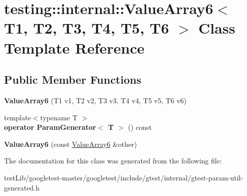 \hypertarget{classtesting_1_1internal_1_1ValueArray6}{}\section{testing\+:\+:internal\+:\+:Value\+Array6$<$ T1, T2, T3, T4, T5, T6 $>$ Class Template Reference}
\label{classtesting_1_1internal_1_1ValueArray6}
\subsection*{Public Member Functions}
\begin{DoxyCompactItemize}
\item 
\mbox{\label{classtesting_1_1internal_1_1ValueArray6_ad1c323929591d89807220281ceb6d4d5}} 
{\bfseries Value\+Array6} (T1 v1, T2 v2, T3 v3, T4 v4, T5 v5, T6 v6)
\item 
\mbox{\label{classtesting_1_1internal_1_1ValueArray6_ab6cb557146bca7cf5fcfa40f10dee9da}} 
{\footnotesize template$<$typename T $>$ }\\{\bfseries operator Param\+Generator$<$ T $>$} () const
\item 
\mbox{\label{classtesting_1_1internal_1_1ValueArray6_a270702109b4185c6749310902fed7456}} 
{\bfseries Value\+Array6} (const \hyperlink{classtesting_1_1internal_1_1ValueArray6}{Value\+Array6} \&other)
\end{DoxyCompactItemize}


The documentation for this class was generated from the following file\+:\begin{DoxyCompactItemize}
\item 
test\+Lib/googletest-\/master/googletest/include/gtest/internal/gtest-\/param-\/util-\/generated.\+h\end{DoxyCompactItemize}
